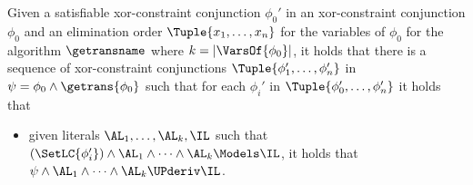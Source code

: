 \begin{lemma}
\label{Lem:GEPropagation}
Given a satisfiable xor-constraint conjunction $ \phi_0' $ in an
xor-constraint conjunction $ \phi_0$ and an elimination
order
$\Tuple{x_1,\dots,x_n}$ for the variables of $\phi_0$ for the algorithm
$\getransname$ where $k=|\VarsOf{\phi_0}|$, it holds that there is a sequence of xor-constraint conjunctions $
\Tuple{\phi_1',\dots,\phi_n'}$ in $ \psi = \phi_0 \wedge \getrans{\phi_0} $
such that for each $ \phi_i'$ in $\Tuple{\phi_0',\dots,\phi_n'}$ it holds that
\begin{itemize}
\item given literals $ \AL_1, \dots, \AL_k, \IL$ such that $ (\SetLC{\phi_i'}) \wedge \AL_1 \wedge \dots \wedge \AL_k \Models \IL $, it holds that
    $ \psi \wedge \AL_1 \wedge \dots \wedge \AL_k \UPderiv \IL $.
\end{itemize}
\end{lemma}

